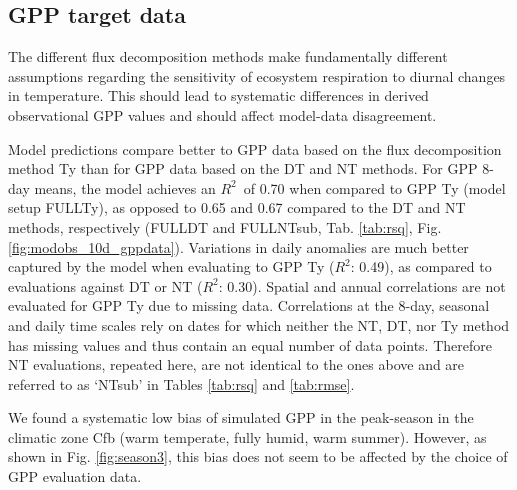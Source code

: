 \documentclass[gmd, manuscript]{copernicus}
\newcommand{\rsq}{$R^2$}
\begin{document}
\clearpage

\subsection{GPP target data}
\label{sec:results_gppdata}

The different flux decomposition methods make fundamentally different assumptions regarding the sensitivity of ecosystem respiration to diurnal changes in temperature. This should lead to systematic differences in derived observational GPP values and should affect model-data disagreement.

Model predictions compare better to GPP data based on the flux decomposition method Ty \citep{wang17natpl} than for GPP data based on the DT and NT methods. For GPP  8-day means, the model achieves an \rsq\ of 0.70 when compared to GPP Ty (model setup FULL\textunderscore Ty), as opposed to 0.65 and 0.67 compared to the DT and NT methods, respectively (FULL\textunderscore DT and FULL\textunderscore NTsub, Tab. \ref{tab:rsq}, Fig. \ref{fig:modobs_10d_gppdata}). Variations in daily anomalies are much better captured by the model when evaluating to GPP Ty (\rsq : 0.49), as compared to evaluations against DT or NT (\rsq : 0.30). Spatial and annual correlations are not evaluated for GPP Ty due to missing data. Correlations at the 8-day, seasonal and daily time scales rely on dates for which neither the NT, DT, nor Ty method has missing values and thus contain an equal number of data points. Therefore NT evaluations, repeated here, are not identical to the ones above and are referred to as `NTsub' in Tables \ref{tab:rsq} and \ref{tab:rmse}. 
 
We found a systematic low bias of simulated GPP in the peak-season in the climatic zone Cfb (warm temperate, fully humid, warm summer). However, as shown in Fig. \ref{fig:season3}, this bias does not seem to be affected by the choice of GPP evaluation data.
\end{document}
